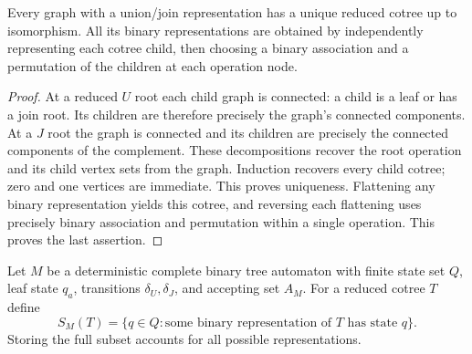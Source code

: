 \begin{lemma}\label{lem:canonical-cotree}
Every graph with a union/join representation has a unique reduced cotree
up to isomorphism. All its binary representations are obtained by
independently representing each cotree child, then choosing a binary
association and a permutation of the children at each operation node.
\end{lemma}
\begin{proof}
At a reduced $U$ root each child graph is connected: a child is a leaf or
has a join root. Its children are therefore precisely the graph's connected
components. At a $J$ root the graph is connected and its children are
precisely the connected components of the complement. These decompositions
recover the root operation and its child vertex sets from the graph.
Induction recovers every child cotree; zero and one vertices are immediate.
This proves uniqueness. Flattening any binary representation yields this
cotree, and reversing each flattening uses precisely binary association
and permutation within a single operation. This proves the last assertion.
\end{proof}

Let $M$ be a deterministic complete binary tree automaton with finite
state set $Q$, leaf state $q_a$, transitions $\delta_U,\delta_J$, and
accepting set $A_M$. For a reduced cotree $T$ define
\[
 S_M(T)=\{q\in Q:\text{some binary representation of }T
                         \text{ has state }q\}.              \tag{3}
\]
Storing the full subset accounts for all possible representations.

